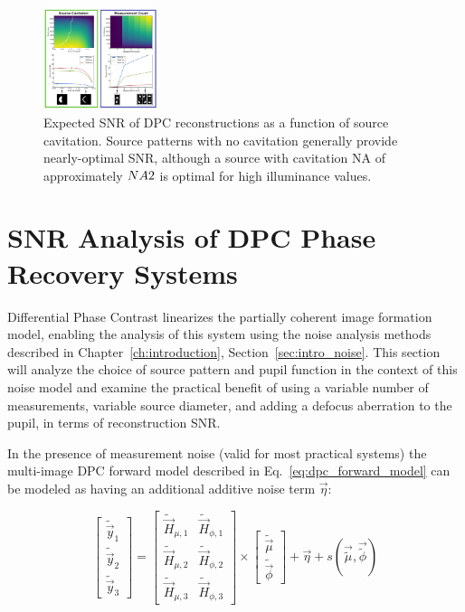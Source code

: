 \begin{figure}
  \label{fig:phase:dpc_cavitation}
  \begin{center}
    \includegraphics[width=0.3\textwidth]{figures/fig_phase_dpc_optimization_cavitation.pdf}
  \end{center}
  \caption{Expected SNR of DPC reconstructions as a function of source cavitation. Source patterns with no cavitation generally provide nearly-optimal SNR, although a source with cavitation NA of approximately $NA \/ 2$ is optimal for high illuminance values.}
\end{figure}

\section{SNR Analysis of DPC Phase Recovery Systems}
Differential Phase Contrast linearizes the partially coherent image formation model, enabling the analysis of this system using the noise analysis methods described in Chapter~\ref{ch:introduction}, Section~\ref{sec:intro_noise}. This section will analyze the choice of source pattern and pupil function in the context of this noise model and examine the practical benefit of using a variable number of measurements, variable source diameter, and adding a defocus aberration to the pupil, in terms of reconstruction SNR.

In the presence of measurement noise (valid for most practical systems) the multi-image DPC forward model described in Eq.~\ref{eq:dpc_forward_model} can be modeled as having an additional additive noise term $\vec{\eta}$:

\begin{equation}
    \label{eq:dpc_forward_model_noise}
    \begin{bmatrix}\tilde{\vec{y}}_1 \\ \tilde{\vec{y}}_2 \\ \tilde{\vec{y}}_3\end{bmatrix} = \begin{bmatrix}\tilde{\vec{H}}_{\mu, 1} & \tilde{\vec{H}}_{\phi, 1}\\ \tilde{\vec{H}}_{\mu, 2} & \tilde{\vec{H}}_{\phi, 2} \\ \tilde{\vec{H}}_{\mu, 3} & \tilde{\vec{H}}_{\phi, 3}\end{bmatrix} \times \begin{bmatrix}\tilde{\vec{\mu}} \\ \tilde{\vec{\phi}}\end{bmatrix} + \vec{\eta} + s(\vec{\tilde{\mu}}, \vec{\tilde{\phi}})
\end{equation}

